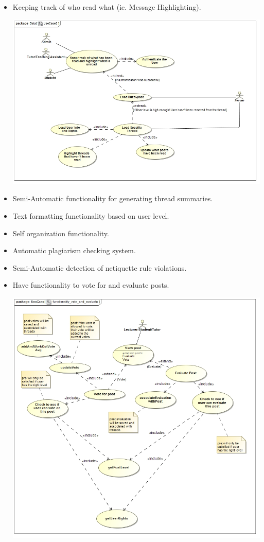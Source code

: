 \documentclass[a4paper,12pt]{report}
\begin{document}
\begin{itemize}
  \item Keeping track of who read what (ie. Message Highlighting).
 	\begin{center}
  	\includegraphics[width=1\textwidth]{../Functional_Requirements_Diagrams/UseCases1,2,3 - Kale-ab Tessera/UseCase3.jpg}\\[0.4cm]    
	\end{center} 
  \item Semi-Automatic functionality for generating thread summaries.
  \item Text formatting functionality based on user level.
  \item Self organization functionality.
  \item Automatic plagiarism checking system.
  \item Semi-Automatic detection of netiquette rule violations.
  \item Have functionality to vote for and evaluate posts.
\begin{center}
  	\includegraphics[width=1\textwidth]{../Functional_Requirements_DIagrams/UseCases/functionality_vote_and_evaluate.jpg}\\[0.4cm]    
	\end{center}	
\end{itemize}
\end{document}
